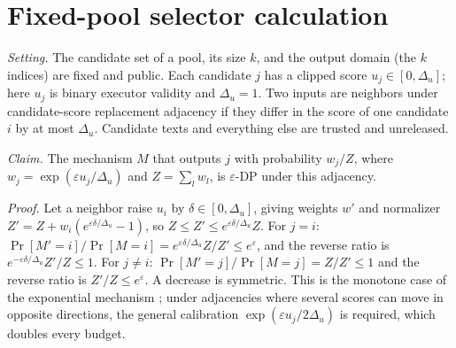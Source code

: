 \begin{center}
\end{center}

\section{Fixed-pool selector calculation}
\label{app:selector}

\noindent\textit{Setting.} The candidate set of a pool, its size $k$, and the output domain (the $k$ indices) are fixed and public. Each candidate $j$ has a clipped score $u_j\in[0,\Delta_u]$; here $u_j$ is binary executor validity and $\Delta_u=1$. Two inputs are neighbors under candidate-score replacement adjacency if they differ in the score of one candidate $i$ by at most $\Delta_u$. Candidate texts and everything else are trusted and unreleased.

\noindent\textit{Claim.} The mechanism $M$ that outputs $j$ with probability $w_j/Z$, where $w_j=\exp(\varepsilon u_j/\Delta_u)$ and $Z=\sum_l w_l$, is $\varepsilon$-DP under this adjacency.

\noindent\textit{Proof.} Let a neighbor raise $u_i$ by $\delta\in[0,\Delta_u]$, giving weights $w'$ and normalizer $Z'=Z+w_i(e^{\varepsilon\delta/\Delta_u}-1)$, so $Z\le Z'\le e^{\varepsilon\delta/\Delta_u}Z$. For $j=i$: $\Pr[M'=i]/\Pr[M=i]=e^{\varepsilon\delta/\Delta_u}Z/Z'\le e^{\varepsilon}$, and the reverse ratio is $e^{-\varepsilon\delta/\Delta_u}Z'/Z\le1$. For $j\ne i$: $\Pr[M'=j]/\Pr[M=j]=Z/Z'\le1$ and the reverse ratio is $Z'/Z\le e^{\varepsilon}$. A decrease is symmetric. This is the monotone case of the exponential mechanism \citep{mcsherry2007mechanism}; under adjacencies where several scores can move in opposite directions, the general calibration $\exp(\varepsilon u_j/2\Delta_u)$ is required, which doubles every budget.

